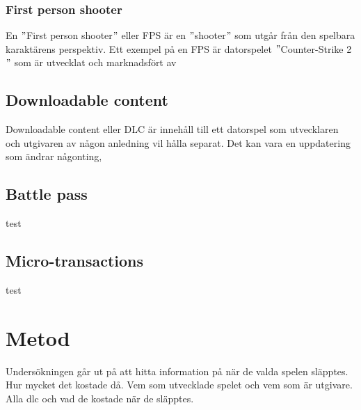 \documentclass[11p]{article}
\begin{document}
\begin{otherlanguage}{swedish}
    \subsubsection{First person shooter}
    En \("\)First person shooter\("\) eller FPS är en \("\)shooter\("\) som utgår från den spelbara karaktärens perspektiv.
    Ett exempel på en FPS är datorspelet \("\)Counter-Strike 2\("\) som är utvecklat och marknadsfört av \textcite{CounterStrike}

    \subsection{Downloadable content}
    Downloadable content eller DLC är innehåll till ett datorspel som utvecklaren och utgivaren  av någon anledning vil hålla separat.
    Det kan vara en uppdatering som ändrar någonting,

    \subsection{Battle pass}
    test
    \subsection{Micro-transactions}
    test
\section{Metod}

     Undersökningen går ut på att hitta information på när de valda spelen släpptes.
     Hur mycket det kostade då. %
     Vem som utvecklade spelet och vem som är utgivare.
     Alla dlc och vad de kostade när de släpptes.

    \printbibliography[title={Referenser}]

    \end{otherlanguage}
\end{document}
